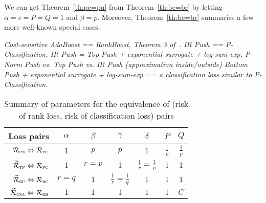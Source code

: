 We can get Theorem~\ref{th:pc=pn} from Theorem~\ref{th:bc=br} by letting $\alpha=c=P=Q=1$ and $\beta=p$.
Moreover, Theorem~\ref{th:bc=br} summaries a few more well-known special cases.

\TODO

{\it Cost-sensitive AdaBoost == RankBoost, Theorem 3 of~\cite{ertekin2011equivalence}.
IR Push == P-Classification,
IR Push = Top Push + exponential surrogate + log-sum-exp, P-Norm Push vs. Top Push vs. IR Push (approximation inside/outside)
Bottom Push + exponential surrogate + log-sum-exp == a classification loss similar to P-Classification.
}

\begin{table}[!h]
\centering
\caption{Summary of parameters for the equivalence of (risk of rank loss, risk of classification loss) pairs}
\label{tab:config}
\begin{tabular}{r*{6}{c}}
\toprule
{\bf Loss pairs}                                         & $\alpha$ & $\beta$ & $\gamma$ & $\delta$ & $P$ & $Q$ \\ \hline
$\mathcal{R}_\textsc{pn} \Leftrightarrow \mathcal{R}_\textsc{pc}$            & $1$      & $p$     & $p$      & $1$      & $\frac{1}{p}$ & $\frac{1}{p}$ \\
$\widetilde{\mathcal{R}}_\textsc{tp} \Leftrightarrow \mathcal{R}_\textsc{pc}$  & $1$      & $r=p$   & $1$      & $\frac{1}{r}=\frac{1}{p}$ & $1$ & $1$ \\
$\widetilde{\mathcal{R}}_\textsc{bp} \Leftrightarrow \mathcal{R}_\textsc{rc}$  & $r=q$    & $1$     & $\frac{1}{r}=\frac{1}{q}$ & $1$ & $1$ & $1$ \\
$\widetilde{\mathcal{R}}_\textsc{csa} \Leftrightarrow \mathcal{R}_\textsc{rb}$ & $1$      & $1$     & $1$      & $1$      & $1$ & $C$ \\
\bottomrule
\end{tabular}
\end{table}


